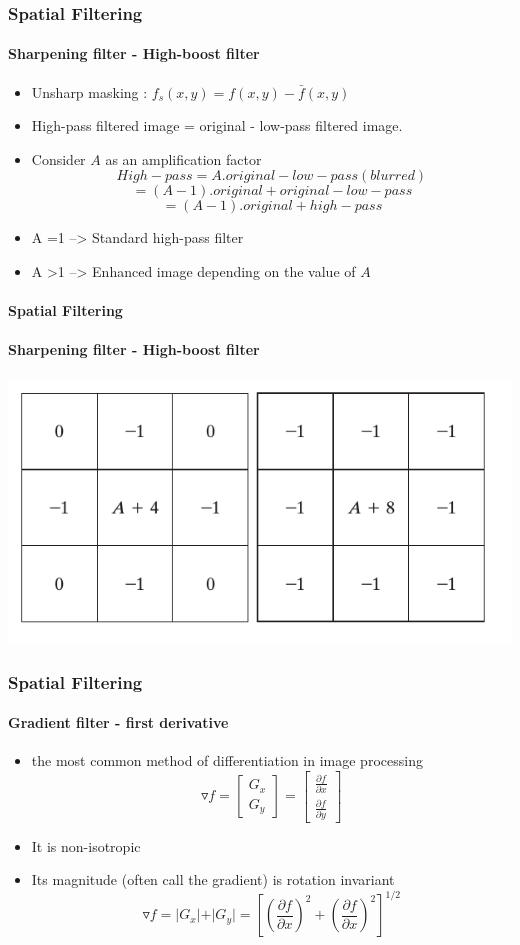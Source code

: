 \documentclass{beamer}
\begin{document}
\begin{frame}
\frametitle{Spatial Filtering}
\framesubtitle{Sharpening filter - High-boost filter}
\begin{itemize}
\item Unsharp masking : $f_{s}(x,y) = f(x,y)-\bar{f}(x,y)$
\item High-pass filtered image = original - low-pass filtered image. 
\item Consider $A$ as an amplification factor
$$ High-pass = A.original - low-pass(blurred)$$
$$ = (A-1).original + original - low-pass $$
$$ = (A-1).original + high-pass$$
\item A =1 --> Standard high-pass filter 
\item A >1 --> Enhanced image depending on the value of $A$   
\end{itemize}
\end{frame}
\begin{frame}
\framesubtitle{Spatial Filtering}
\framesubtitle{Sharpening filter - High-boost filter}
\begin{center}
\includegraphics[scale=0.3]{images/Spatial9-HBF.png}
\end{center}
\end{frame}
\begin{frame}
\frametitle{Spatial Filtering}
\framesubtitle{Gradient filter - first derivative}
\begin{itemize}
\item the most common method of differentiation in image processing
 $$\triangledown f = 
\begin{bmatrix}
G_x\\G_y
\end{bmatrix} = 
\begin{bmatrix}
\frac{\partial f}{\partial x}\\
 \frac{\partial f}{\partial y}
 \end{bmatrix}
$$
\item It is non-isotropic
\item Its magnitude (often call the gradient) is rotation invariant
$$\triangledown f = \vert G_{x} \vert + \vert G_{y} \vert = [(\frac{\partial f}{\partial x})^2 + (\frac{\partial f}{\partial x})^2]^{1/2} $$
\end{itemize}

\end{frame}
\end{document}
